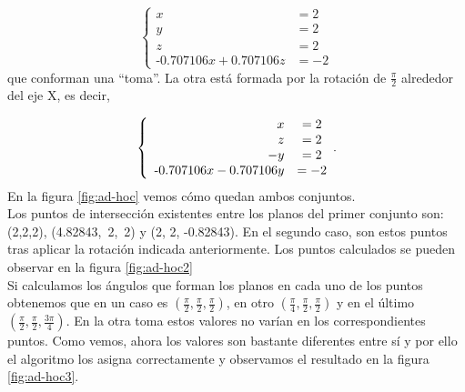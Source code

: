\[
\left\{
\begin{array}{rcl}
x &= 2\\ 
y &= 2\\
z &= 2\\
\text{-0.707106}x + \text{0.707106}z &= -2
\end{array}
\right.
\]
que conforman una ``toma''. La otra está formada por la rotación de $ \frac{\pi}{2} $ alrededor del eje X, es decir,

\[\\
\left\{
\begin{array}{rcl}
x &= 2\\
z &= 2\\
-y & = 2\\
\text{-0.707106}x - \text{0.707106}y &= -2
\end{array}.
\right. 
\]
En la figura \ref{fig:ad-hoc} vemos cómo quedan ambos conjuntos. \\


Los puntos de intersección existentes entre los planos del primer conjunto son: (2,2,2), \mbox{(4.82843, 2, 2)} y (2, 2, -0.82843). En el segundo caso, son estos puntos tras aplicar la rotación indicada anteriormente. Los puntos calculados se pueden observar en la figura \ref{fig:ad-hoc2}\\


Si calculamos los ángulos que forman los planos en cada uno de los puntos obtenemos que en un caso es $ (\frac{\pi}{2}, \frac{\pi}{2}, \frac{\pi}{2}) $, en otro $ (\frac{\pi}{4}, \frac{\pi}{2}, \frac{\pi}{2}) $ y en el último $ (\frac{\pi}{2}, \frac{\pi}{2}, \frac{3\pi}{4}) $. En la otra toma estos valores no varían en los correspondientes puntos. Como vemos, ahora los valores son bastante diferentes entre sí y por ello el algoritmo los asigna correctamente y observamos el resultado en la figura \ref{fig:ad-hoc3}. \\

